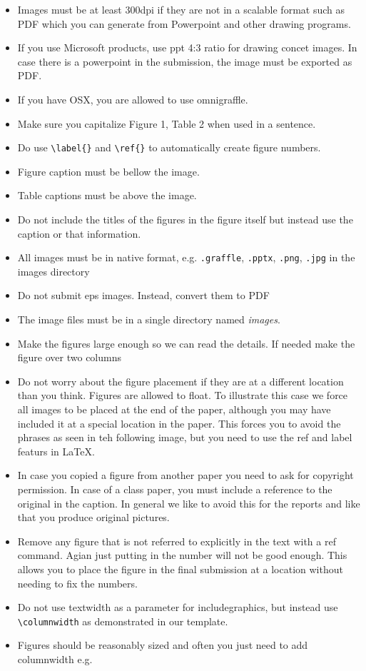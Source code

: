 \begin{itemize}[label=$\Box$]
  \item Images must be at least 300dpi if they are not in a scalable
    format such as PDF which you can generate from Powerpoint and
    other drawing programs. 
  \item If you use Microsoft products, use ppt 4:3 ratio for drawing
    concet images. In case there is a powerpoint in the submission,
    the image must be exported as PDF.
  \item If you have OSX, you are allowed to use omnigraffle.
  \item Make sure you capitalize Figure 1, Table 2 when used in a
    sentence.
  \item Do use \verb|\label{}| and \verb|\ref{}| to automatically create
    figure numbers.
  \item Figure caption must be bellow the image.
  \item Table captions must be above the image.
  \item Do not include the titles of the figures in the figure itself
    but instead use the caption or that information.
  \item All images must be in native format, e.g. \verb|.graffle|, \verb|.pptx|,
    \verb|.png|, \verb|.jpg| in the images directory
  \item Do not submit eps images. Instead, convert them to PDF
  \item The image files must be in a single directory named \textit{images}.
  \item Make the figures large enough so we can read the details. If
    needed make the figure over two columns
  \item Do not worry about the figure placement if they are at a
    different location than you think. Figures are allowed to
    float. To illustrate this case we force all images to be placed at
    the end of the paper, although you may have included it at a
    special location in the paper. This forces you to avoid the
    phrases as seen in teh following image, but you need to use the
    ref and label featurs in LaTeX.
  \item In case you copied a figure from another paper you need to ask
    for copyright permission. In case of a class paper, you must
    include a reference to the original in the caption. In general we
    like to avoid this for the reports and like that you produce
    original pictures.
  \item Remove any figure that is not referred to explicitly in the
    text with a ref command. Agian just putting in the number will not
    be good enough. This allows you to place the figure in the final
    submission at a location without needing to fix the numbers.
  \item Do not use textwidth as a parameter for includegraphics, but
    instead use \verb|\columnwidth| as demonstrated in our template. 
  \item Figures should be reasonably sized and often you just need to
    add columnwidth e.g.


\end{itemize}
